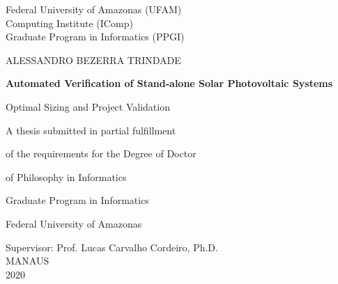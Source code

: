 \begin{titlepage}
    \begin{center}
        \Large
        Federal University of Amazonas (UFAM)\\
        Computing Institute (IComp)\\
		Graduate Program in Informatics (PPGI)\\

        \vspace*{1cm}
        
		\Large
		ALESSANDRO BEZERRA TRINDADE

        \vspace*{2cm}
        		        
        \Huge
        \textbf{Automated Verification of Stand-alone Solar Photovoltaic Systems}
        
        \vspace{0.5cm}
        \LARGE
        Optimal Sizing and Project Validation
        
        \vspace{2cm}
    \end{center}        
    

\hspace{6cm}        A thesis submitted in partial fulfillment

\hspace{6cm}        of the requirements for the Degree of Doctor

\hspace{6cm}        of Philosophy in Informatics

\hspace{6cm}        Graduate Program in Informatics 

\hspace{6cm}        Federal University of Amazonas
        
        \vspace{2cm}
        
        \begin{center}
        Supervisor: Prof. Lucas Carvalho Cordeiro, Ph.D.\\
        \vspace{1cm}
        MANAUS\\
        2020\\
        \end{center}
\end{titlepage}